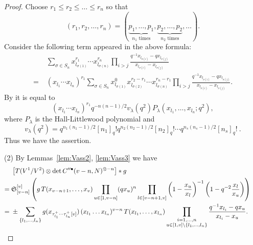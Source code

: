 \documentclass[12pt]{amsart}
\theoremstyle{definition}
\theoremstyle{remark}
\numberwithin{equation}{subsection}
\begin{document}
\begin{proof}
Choose $r_1 \le r_2 \le \dots \le r_n$ so that
\begin{equation*}
   (r_1,r_2,\dots,r_n) = (
     \underbrace{p_1,\dots,p_1}_{\text{$n_1$ times}}, 
     \underbrace{p_2,\dots,p_2}_{\text{$n_2$ times}}, \dots).
\end{equation*}
Consider the following term appeared in the above formula:
\begin{equation*}
\begin{split}
   & \sum_{\sigma\in S_n} 
    x_{l_{\sigma(1)}}^{r_1}\cdots x_{l_{\sigma(n)}}^{r_n}
    \prod_{i > j} 
    \frac{q^{-1} x_{l_{\sigma(i)}} - q x_{l_{\sigma(j)}}}
    {x_{l_{\sigma(i)}} - x_{l_{\sigma(j)}}} \\
  =\; & (x_{l_1}\cdots x_{l_n})^{r_1}
   \sum_{\sigma\in S_n} 
    x_{l_{\sigma(1)}}^0x_{l_{\sigma(2)}}^{r_2-r_1}\cdots 
     x_{l_{\sigma(n)}}^{r_n-r_1}
    \prod_{i > j} 
    \frac{q^{-1} x_{l_{\sigma(i)}} - q x_{l_{\sigma(j)}}}
    {x_{l_{\sigma(i)}} - x_{l_{\sigma(j)}}}.
\end{split}
\end{equation*}
By \cite[III(2.1)]{Mac} it is equal to
\begin{equation*}
   (x_{l_1}\cdots x_{l_n})^{r_1} q^{-n(n-1)/2} v_\lambda(q^2)
   P_\lambda(x_{l_1},\dots, x_{l_n};q^2),
\end{equation*}
where $P_\lambda$ is the Hall-Littlewood polynomial and
\begin{equation*}
   v_\lambda(q^2) = q^{n_1(n_1-1)/2} [n_1]_q ! 
   q^{n_2(n_2-1)/2} [n_2]_q ! \cdots q^{n_s(n_s-1)/2} [n_s]_q !\ .
\end{equation*}
Thus we have the assertion.

(2) By Lemmas~\ref{lem:Vass2}, \ref{lem:Vass3} we have
\makeatletter\tagsleft@false
\begin{align}
   & \left[T(V^1/V^2)\otimes
           \det C^{\prime\prime\bullet}(v-n,N)^{\otimes-n}\right] \ast g
      \notag\\
  =\; & {\mathfrak S}_{[v-n]}^{[v]}
    \left(g\, T(x_{v-n+1},\dots, x_v)
    \prod_{u\in [1,v-n]} (q x_u)^n \prod_{l\in [v-n+1,v]}
     \left( 1 - \frac{x_u}{x_l}\right)^{-1} 
     \left( 1 - q^{-2} \frac{x_l}{x_u}\right) \right) \notag\\
  =\; & \pm \sum_{\{l_1,\dots, l_n\}}
     g(x_{\tau_{l_1}^+\cdots\tau_{l_n}^+[v]})\,
     (x_{l_1}\dots x_{l_n})^{v-n}\,
     T(x_{l_1}, \dots, x_{l_n})
     \prod_{\substack{i=1,\dots, n\\
                      u\in [1,v]\setminus \{l_1,\dots, l_n\}}}
       \frac{q^{-1} x_{l_i} - q x_u}{x_{l_i} - x_u}. \tag*{\qed}
\end{align}
\makeatother
\renewcommand{\qed}{}
\end{proof}
\end{document}
